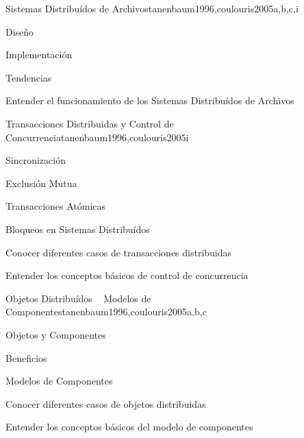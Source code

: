 \begin{syllabus}
\begin{unit}{Sistemas Distribuídos de Archivos}{tanenbaum1996,coulouris2005}{a,b,c,i}
   \begin{topics}
      \item Diseño
      \item Implementación
      \item Tendencias
   \end{topics}

   \begin{unitgoals}
      \item Entender el funcionamiento de los Sistemas Distribuídos de Archivos
   \end{unitgoals}
\end{unit}

\begin{unit}{Transacciones Distribuidas y Control de Concurrencia}{tanenbaum1996,coulouris2005}{i}
   \begin{topics}
      \item Sincronización
      \item Exclusión Mutua
      \item Transacciones Atómicas
      \item Bloqueos en Sistemas Distribuídos
   \end{topics}

   \begin{unitgoals}
      \item Conocer diferentes casos de transacciones distribuidas
      \item Entender los conceptos básicos de control de concurrencia
      \item 
   \end{unitgoals}
\end{unit}

\begin{unit}{Objetos Distribuídos ~ Modelos de Componentes}{tanenbaum1996,coulouris2005}{a,b,c}
   \begin{topics}
      \item Objetos y Componentes
      \item Beneficios
      \item Modelos de Componentes
   \end{topics}

   \begin{unitgoals}
      \item Conocer diferentes casos de objetos distribuidas
      \item Entender los conceptos básicos del modelo de componentes
   \end{unitgoals}
\end{unit}


\end{syllabus}
